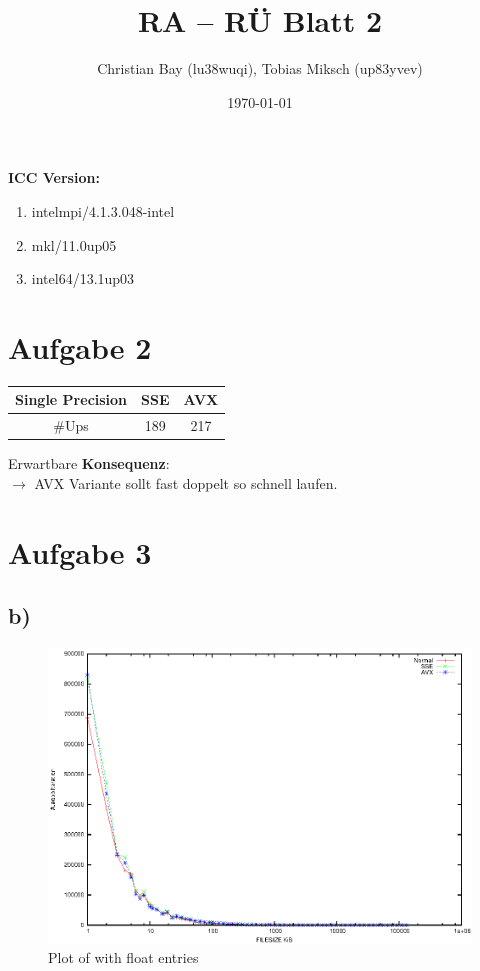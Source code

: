 \documentclass{article}
\title{RA -- R\"U Blatt 2}
\author{Christian Bay (lu38wuqi), Tobias Miksch (up83yvev)}
\date{\today}
\begin{document}
\maketitle

\textbf{ICC Version:}
\begin{enumerate}
	\item intelmpi/4.1.3.048-intel
	\item mkl/11.0up05
	\item intel64/13.1up03
\end{enumerate}

\vspace*{6pt}

\section*{Aufgabe 2}
\begin{tabular}{ c | c | c |}
Single Precision &	SSE			& AVX \\
	\hline
	\#Ups & 189 & 217\\
	\hline
\end{tabular}

\vspace*{10pt}
Erwartbare \textbf{Konsequenz}:\\
$\rightarrow$ AVX Variante sollt fast doppelt so schnell laufen.
\section*{Aufgabe 3}
\subsection*{b)}

\begin{center}
	\begin{figure}[h]
	\includegraphics[scale=0.75]{images/float.eps}
		\caption{Plot of with float entries}
	\end{figure}
\end{center}
\end{document}
